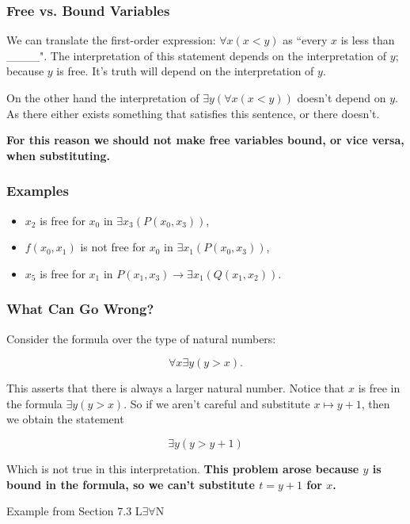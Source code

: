 \documentclass{beamer}
\theoremstyle{indentDefn} \newtheorem{defn}[]{Definition}
\begin{document}
\begin{frame}
	\frametitle{Free vs. Bound Variables}
	
	We can translate the first-order expression: $\forall x (x < y)$ as ``every $x$ is less than \_\_\_\_". The interpretation of this statement depends on the interpretation of $y$; because $y$ is free. It's truth will depend on the interpretation of $y$.
	
	\vspace{0.5cm} 
	
	On the other hand the interpretation of $\exists y (\forall x (x < y))$ doesn't depend on $y$. As there either exists something that satisfies this sentence, or there doesn't. 
	
	\vspace{0.5cm}

	{\bf For this reason we should not make free variables bound, or vice versa, when substituting.}
	
	
\end{frame}

\begin{frame}
	\frametitle{Examples}

	\begin{itemize}
		\item[]	$x_{2}$ is free for $x_{0}$ in $\exists x_{3} (P(x_{0},x_{3}))$, \vspace{0.2cm}
		\item[] $f(x_{0},x_{1})$ is not free for $x_{0}$ in $\exists x_{1} (P(x_{0},x_{3}))$, \vspace{0.2cm}
		\item[] $x_{5}$ is free for $x_{1}$ in $P(x_{1},x_{3})\rightarrow \exists x_{1} (Q(x_{1},x_{2}))$.
	\end{itemize}	
		
\end{frame}

\begin{frame}
	\frametitle{What Can Go Wrong?}
	
	Consider the formula over the type of natural numbers: 
	
	$$\forall x \exists y (y > x).$$
	
	This asserts that there is always a larger natural number. Notice that $x$ is free in the formula $\exists y (y > x)$. So if we aren't careful and substitute $x \mapsto y+1$, then we obtain the statement 
	
	$$ \exists y (y > y+1)$$
	
	Which is not true in this interpretation. {\bf This problem arose because $y$ is bound in the formula, so we can't substitute $t=y+1$ for $x$.}
	
	\footnotesize{Example from Section 7.3 L$\exists\forall$N}
	
\end{frame}
\end{document}
